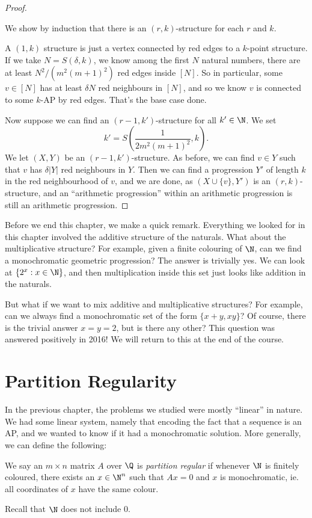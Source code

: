 \documentclass[a4paper]{article}
\begin{document}
\begin{proof}
\begin{center}
\begin{tikzpicture}
    \end{tikzpicture}
  \end{center}
  We show by induction that there is an $(r, k)$-structure for each $r$ and $k$.

  A $(1, k)$ structure is just a vertex connected by red edges to a $k$-point structure. If we take $N = S(\delta, k)$, we know among the first $N$ natural numbers, there are at least $N^2/(m^2(m + 1)^2)$ red edges inside $[N]$. So in particular, some $v \in [N]$ has at least $\delta N$ red neighbours in $[N]$, and so we know $v$ is connected to some $k$-AP by red edges. That's the base case done.

  Now suppose we can find an $(r - 1, k')$-structure for all $k' \in \N$. We set
  \[
    k' = S\left(\frac{1}{2m^2(m + 1)^2}, k\right).
  \]
  We let $(X, Y)$ be an $(r - 1, k')$-structure. As before, we can find $v \in Y$ such that $v$ has $\delta|Y|$ red neighbours in $Y$. Then we can find a progression $Y'$ of length $k$ in the red neighbourhood of $v$, and we are done, as $(X \cup \{v\}, Y')$ is an $(r, k)$-structure, and an ``arithmetic progression'' within an arithmetic progression is still an arithmetic progression.
\end{proof}
Before we end this chapter, we make a quick remark. Everything we looked for in this chapter involved the additive structure of the naturals. What about the multiplicative structure? For example, given a finite colouring of $\N$, can we find a monochromatic geometric progression? The answer is trivially yes. We can look at $\{2^x: x \in \N\}$, and then multiplication inside this set just looks like addition in the naturals.

But what if we want to mix additive and multiplicative structures? For example, can we always find a monochromatic set of the form $\{x + y, xy\}$? Of course, there is the trivial answer $x = y = 2$, but is there any other? This question was answered positively in 2016! We will return to this at the end of the course.

\section{Partition Regularity}
In the previous chapter, the problems we studied were mostly ``linear'' in nature. We had some linear system, namely that encoding the fact that a sequence is an AP, and we wanted to know if it had a monochromatic solution. More generally, we can define the following:

\begin{defi}
  We say an $m \times n$ matrix $A$ over $\Q$ is \emph{partition regular} if whenever $\N$ is finitely coloured, there exists an $x \in \N^n$ such that $Ax = 0$ and $x$ is monochromatic, ie. all coordinates of $x$ have the same colour.
\end{defi}
Recall that $\N$ does not include $0$.
\end{document}
